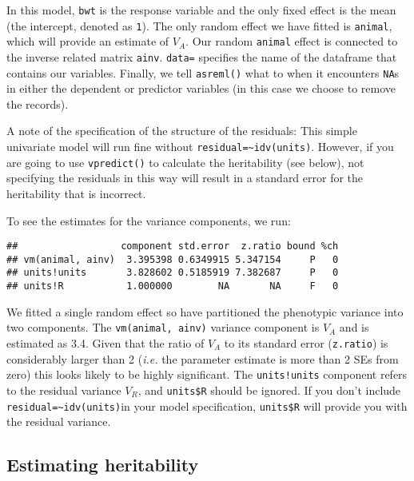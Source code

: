 \documentclass[12pt,]{book}
\newenvironment{Shaded}{\begin{snugshade}}{\end{snugshade}}
\newcommand{\KeywordTok}[1]{\textcolor[rgb]{0.13,0.29,0.53}{\textbf{#1}}}
\newcommand{\NormalTok}[1]{#1}
\newcommand{\OperatorTok}[1]{\textcolor[rgb]{0.81,0.36,0.00}{\textbf{#1}}}
\begin{document}
In this model, \texttt{bwt} is the response variable and the only fixed effect is the mean (the intercept, denoted as \texttt{1}). The only random effect we have fitted is \texttt{animal}, which will provide an estimate of \(V_A\). Our random \texttt{animal} effect is connected to the inverse related matrix \texttt{ainv}. \texttt{data=} specifies the name of the dataframe that contains our variables. Finally, we tell \texttt{asreml()} what to when it encounters \texttt{NA}s in either the dependent or predictor variables (in this case we choose to remove the records).

A note of the specification of the structure of the residuals: This simple univariate model will run fine without \texttt{residual=\textasciitilde{}idv(units)}. However, if you are going to use \texttt{vpredict()} to calculate the heritability (see below), not specifying the residuals in this way will result in a standard error for the heritability that is incorrect.

To see the estimates for the variance components, we run:

\begin{Shaded}
\end{Shaded}

\begin{verbatim}
##                  component std.error  z.ratio bound %ch
## vm(animal, ainv)  3.395398 0.6349915 5.347154     P   0
## units!units       3.828602 0.5185919 7.382687     P   0
## units!R           1.000000        NA       NA     F   0
\end{verbatim}

We fitted a single random effect so have partitioned the phenotypic variance into two components. The \texttt{vm(animal,\ ainv)} variance component is \(V_A\) and is estimated as 3.4. Given that the ratio of \(V_A\) to its standard error (\texttt{z.ratio}) is considerably larger than 2 (\emph{i.e.} the parameter estimate is more than 2 SEs from zero) this looks likely to be highly significant. The \texttt{units!units} component refers to the residual variance \(V_R\), and \texttt{units\$R} should be ignored. If you don't include \texttt{residual=\textasciitilde{}idv(units)}in your model specification, \texttt{units\$R} will provide you with the residual variance.

\hypertarget{estimating-heritability}{%
\subsection{Estimating heritability}\label{estimating-heritability}}
\end{document}
